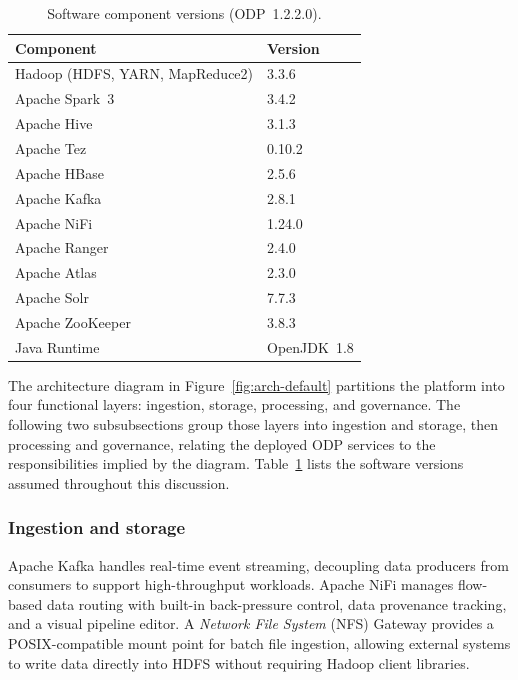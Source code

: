\begin{table}[htbp]
  \centering
  \caption{Software component versions (ODP~1.2.2.0).}
  \label{tab:odp-versions}
  \renewcommand{\arraystretch}{1.2}
  \begin{tabular}{@{} l l @{}}
    \hline
    \textbf{Component} & \textbf{Version} \\
    \hline
    Hadoop (HDFS, YARN, MapReduce2) & 3.3.6 \\
    Apache Spark~3               & 3.4.2 \\
    Apache Hive                  & 3.1.3 \\
    Apache Tez                   & 0.10.2 \\
    Apache HBase                 & 2.5.6 \\
    Apache Kafka                 & 2.8.1 \\
    Apache NiFi                  & 1.24.0 \\
    Apache Ranger                & 2.4.0 \\
    Apache Atlas                 & 2.3.0 \\
    Apache Solr & 7.7.3 \\
    Apache ZooKeeper             & 3.8.3 \\
    Java Runtime                 & OpenJDK~1.8 \\
    \hline
  \end{tabular}
\end{table}

The architecture diagram in Figure~\ref{fig:arch-default} partitions the
platform into four functional layers: ingestion, storage, processing, and
governance. The following two subsubsections group those layers into ingestion and
storage, then processing and governance, relating the deployed ODP services to the
responsibilities implied by the diagram. Table~\ref{tab:odp-versions} lists the
software versions assumed throughout this discussion.

\subsubsection{Ingestion and storage}

Apache Kafka handles real-time event streaming, decoupling
data producers from consumers to support high-throughput workloads. Apache NiFi
manages flow-based data routing with built-in back-pressure control, data
provenance tracking, and a visual pipeline editor. A \emph{Network File System} (NFS) Gateway provides a
POSIX-compatible mount point for batch file ingestion, allowing external systems to write data directly
into HDFS without requiring Hadoop client libraries.

